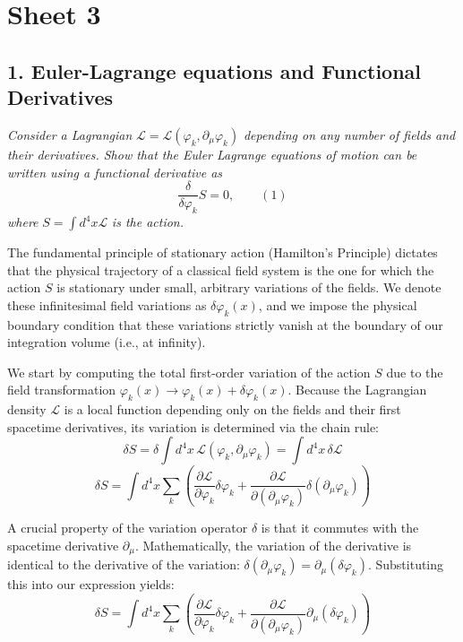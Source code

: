 \section*{Sheet 3}

\subsection*{1. Euler-Lagrange equations and Functional Derivatives}

\begin{center}
    \textit{Consider a Lagrangian } $\mathcal{L} = \mathcal{L}(\varphi_k, \partial_\mu \varphi_k)$ \textit{ depending on any number of fields and their derivatives. Show that the Euler Lagrange equations of motion can be written using a functional derivative as}
    \[
        \frac{\delta}{\delta \varphi_k} S = 0, \qquad (1)
    \]
    \textit{where } $S = \int d^4x \mathcal{L}$ \textit{ is the action.}
\end{center}

The fundamental principle of stationary action (Hamilton's Principle) dictates that the physical trajectory of a classical field system is the one for which the action $S$ is stationary under small, arbitrary variations of the fields. We denote these infinitesimal field variations as $\delta \varphi_k(x)$, and we impose the physical boundary condition that these variations strictly vanish at the boundary of our integration volume (i.e., at infinity).

We start by computing the total first-order variation of the action $S$ due to the field transformation $\varphi_k(x) \to \varphi_k(x) + \delta\varphi_k(x)$. Because the Lagrangian density $\mathcal{L}$ is a local function depending only on the fields and their first spacetime derivatives, its variation is determined via the chain rule:
\[
    \delta S = \delta \int d^4x \, \mathcal{L}(\varphi_k, \partial_\mu \varphi_k) = \int d^4x \, \delta \mathcal{L}
\]
\[
    \delta S = \int d^4x \sum_k \left( \frac{\partial \mathcal{L}}{\partial \varphi_k} \delta\varphi_k + \frac{\partial \mathcal{L}}{\partial (\partial_\mu \varphi_k)} \delta(\partial_\mu \varphi_k) \right)
\]

A crucial property of the variation operator $\delta$ is that it commutes with the spacetime derivative $\partial_\mu$. Mathematically, the variation of the derivative is identical to the derivative of the variation: $\delta(\partial_\mu \varphi_k) = \partial_\mu (\delta\varphi_k)$. Substituting this into our expression yields:
\[
    \delta S = \int d^4x \sum_k \left( \frac{\partial \mathcal{L}}{\partial \varphi_k} \delta\varphi_k + \frac{\partial \mathcal{L}}{\partial (\partial_\mu \varphi_k)} \partial_\mu (\delta\varphi_k) \right)
\]

